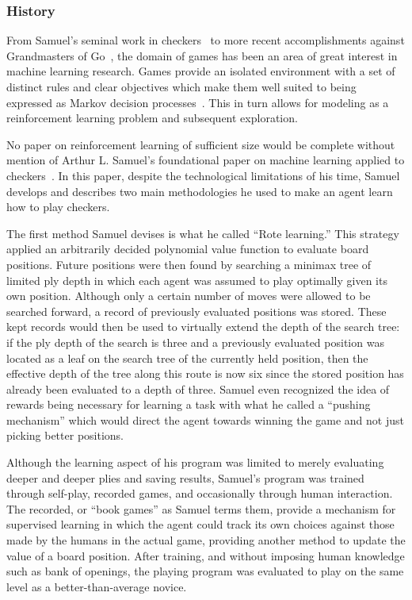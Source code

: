 

\subsubsection*{History}

From Samuel's seminal work in checkers~\cite{samuel_checkers}
to more recent accomplishments against Grandmasters of
Go~\cite{deepmind_alphago},
the domain of games has been an area of great interest in machine learning
research.
%
Games provide an isolated environment with a set of distinct rules and clear
objectives which make them well suited to being expressed as Markov decision
processes~\cite{samuel_checkers}.
%
This in turn allows for modeling as a reinforcement learning problem and
subsequent exploration.



No paper on reinforcement learning of sufficient size would be complete without
mention of Arthur L. Samuel's foundational paper on machine learning applied to
checkers~\cite{samuel_checkers}.
%
In this paper,
despite the technological limitations of his time,
Samuel develops and describes two main methodologies he used to make an agent
learn how to play checkers.

The first method Samuel devises is what he called ``Rote learning.''
%
This strategy applied an arbitrarily decided polynomial value function
to evaluate board positions.
%
Future positions were then found by searching a minimax tree
of limited ply depth
in which each agent was assumed to play optimally given its own position.
%
Although only a certain number of moves were allowed to be searched forward,
a record of previously evaluated positions was stored.
%
These kept records would then be used to virtually extend the depth of the
search tree:
if the ply depth of the search is three and a previously evaluated position was
located as a leaf on the search tree of the currently held position,
then the effective depth of the tree along this route is now six since the
stored position has already been evaluated to a depth of three.
%
Samuel even recognized the idea of rewards being necessary for learning a task
with what he called a ``pushing mechanism'' which would direct the agent towards
winning the game and not just picking better positions.

Although the learning aspect of his program was limited to merely evaluating
deeper and deeper plies and saving results,
Samuel's program was trained through self-play, recorded games, and occasionally
through human interaction.
%
The recorded, or ``book games'' as Samuel terms them,
provide a mechanism for supervised learning in which the agent could track its
own choices against those made by the humans in the actual game,
providing another method to update the value of a board position.
%
After training,
and without imposing human knowledge such as bank of openings,
the playing program was evaluated to play on the same level as a
better-than-average novice.

